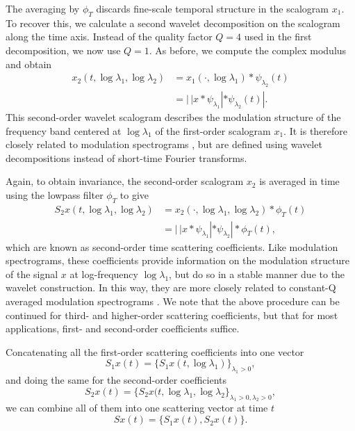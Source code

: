 \documentclass{article}
\newcommand{\lau}{{\lambda_1}}
\newcommand{\lad}{{\lambda_2}}
\begin{document}
\begin{sloppy}
The averaging by $\phi_T$ discards fine-scale temporal structure in the scalogram $x_1$. To recover this, we calculate a second wavelet decomposition on the scalogram along the time axis. Instead of the quality factor $Q = 4$ used in the first decomposition, we now use $Q = 1$. As before, we compute the complex modulus and obtain
\begin{align}
	\nonumber
	x_2(t, \log \lau, \log \lad) &= x_1(\cdot, \log \lau) \ast \psi_\lad(t) \\
	&= |\,| x \ast \psi_\lau | \ast \psi_\lad (t) |.
\end{align}
This second-order wavelet scalogram describes the modulation structure of the frequency band centered at $\log \lau$ of the first-order scalogram $x_1$. It is therefore closely related to modulation spectrograms \cite{atlas,hermansky}, but are defined using wavelet decompositions instead of short-time Fourier transforms.

Again, to obtain invariance, the second-order scalogram $x_2$ is averaged in time using the lowpass filter $\phi_T$ to give
\begin{align}
	\nonumber
	S_2 x(t, \log \lau, \log \lad) &= x_2(\cdot, \log \lau, \log \lad) \ast \phi_T(t) \\
	&= |\,| x \ast \psi_\lau | \ast \psi_\lad | \ast \phi_T(t),
\end{align}
which are known as second-order time scattering coefficients. Like modulation spectrograms, these coefficients provide information on the modulation structure of the signal $x$ at log-frequency $\log \lau$, but do so in a stable manner due to the wavelet construction. In this way, they are more closely related to constant-Q averaged modulation spectrograms \cite{ellis-mcdermott,thompson2003non}. We note that the above procedure can be continued for third- and higher-order scattering coefficients, but that for most applications, first- and second-order coefficients suffice.

Concatenating all the first-order scattering coefficients into one vector
\begin{equation}
	S_1x(t) = \{S_1x(t, \log \lau)\}_{\lau>0},
\end{equation}
and doing the same for the second-order coefficients
\begin{equation}
	S_2x(t) = \{S_2x(t, \log \lau, \log \lad\}_{\lau>0, \lad>0},
\end{equation}
we can combine all of them into one scattering vector at time $t$
\begin{equation}
	Sx(t) = \{S_1x(t), S_2x(t)\}.
\end{equation}


\end{sloppy}
\end{document}
